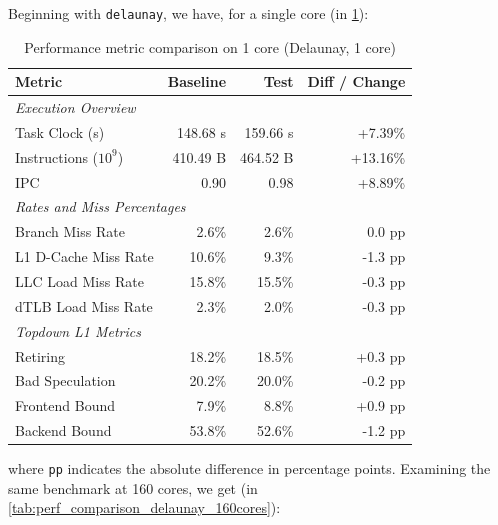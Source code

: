 Beginning with \texttt{delaunay}, we have, for a single core (in \cref{tab:perf_comparison_delaunay_1core}):
    \begin{table}[htbp]
      \centering
      \caption{Performance metric comparison on 1 core (Delaunay, 1 core)}
      \label{tab:perf_comparison_delaunay_1core}
      \begin{tabular}{lrrr}
        \toprule
        \textbf{Metric} & \textbf{Baseline} & \textbf{Test} & \textbf{Diff / Change} \\
        \midrule
        \multicolumn{4}{l}{\textit{Execution Overview}} \\
        \quad Task Clock (s)           & 148.68 s   & 159.66 s   & +7.39\%   \\
        \quad Instructions ($10^9$)    & 410.49 B   & 464.52 B   & +13.16\%  \\
        \quad IPC                      & 0.90       & 0.98       & +8.89\%   \\
        \midrule
        \multicolumn{4}{l}{\textit{Rates and Miss Percentages}} \\
        \quad Branch Miss Rate         & 2.6\%      & 2.6\%      & 0.0 pp    \\
        \quad L1 D-Cache Miss Rate     & 10.6\%     & 9.3\%      & -1.3 pp   \\
        \quad LLC Load Miss Rate       & 15.8\%     & 15.5\%     & -0.3 pp   \\
        \quad dTLB Load Miss Rate      & 2.3\%      & 2.0\%      & -0.3 pp   \\
        \midrule
        \multicolumn{4}{l}{\textit{Topdown L1 Metrics}} \\
        \quad Retiring                 & 18.2\%     & 18.5\%     & +0.3 pp   \\
        \quad Bad Speculation          & 20.2\%     & 20.0\%     & -0.2 pp   \\
        \quad Frontend Bound           & 7.9\%     & 8.8\%     & +0.9 pp   \\
        \quad Backend Bound            & 53.8\%     & 52.6\%     & -1.2 pp   \\
        \bottomrule
      \end{tabular}
    \end{table}
where \texttt{pp} indicates the absolute difference in percentage points.
Examining the same benchmark at 160 cores, we get (in \cref{tab:perf_comparison_delaunay_160cores}):
